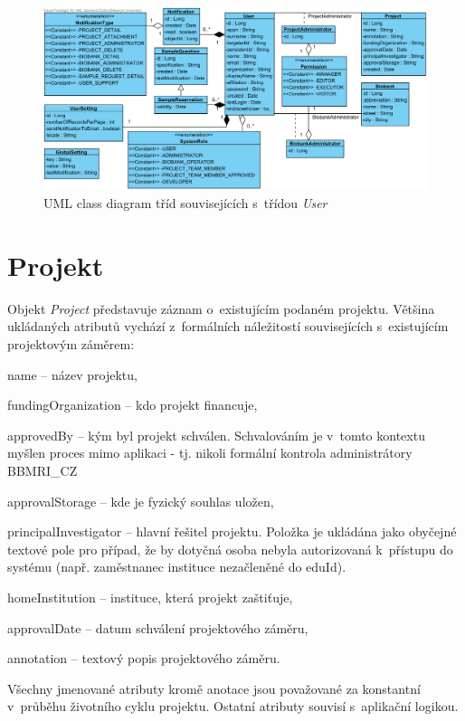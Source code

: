 \documentclass[11pt,draft,oneside]{fithesis2}
\newcommand{\ProjectName}{BBMRI\_CZ\xspace}
\begin{document}
\begin{figure}[h!]
\begin{center}
	\includegraphics[width=\textwidth]{UserView}
\caption{UML class diagram tříd souvisejících s~třídou \textit{User}}
\label{fig:index:uml:class:user}
\end{center}
\end{figure}

\section{Projekt}
Objekt \textit{Project} představuje záznam o~existujícím podaném projektu. Většina ukládaných atributů vychází z~formálních náležitostí souvisejících s~existujícím projektovým záměrem:
\begin{compactitem}
	\item name -- název projektu,
	\item fundingOrganization -- kdo projekt financuje,	
	\item approvedBy -- kým byl projekt schválen. Schvalováním je v~tomto kontextu myšlen proces mimo aplikaci - tj. nikoli formální kontrola administrátory \ProjectName
	\item approvalStorage -- kde je fyzický souhlas uložen,
	\item principalInvestigator -- hlavní řešitel projektu. Položka je ukládána jako obyčejné textové pole pro případ, že by dotyčná osoba nebyla autorizovaná k~přístupu do systému (např. zaměstnanec instituce nezačleněné do eduId).
	\item homeInstitution -- instituce, která projekt zaštiťuje,
	\item approvalDate -- datum schválení projektového záměru,
	\item annotation -- textový popis projektového záměru.
\end{compactitem}
Všechny jmenované atributy kromě anotace jsou považované za konstantní v~průběhu životního cyklu projektu. Ostatní atributy souvisí s~aplikační logikou. 
\end{document}
